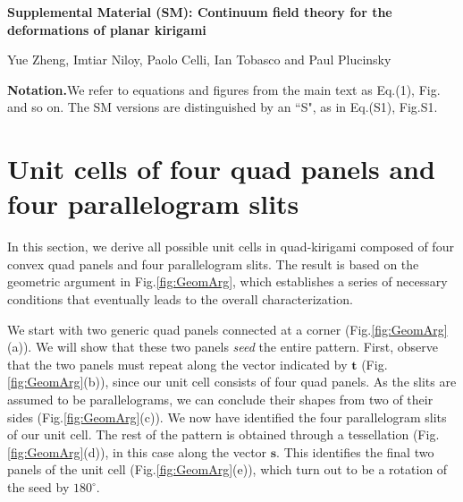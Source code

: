 \documentclass[aps,11pt,tightenlines,notitlepage,superscriptaddress,longbibliography,nofootinbib]{revtex4-1}
\begin{document}
\begin{center}
\Large
{\textbf{Supplemental Material (SM): Continuum field theory for the deformations of planar kirigami}}
\vspace{2mm}
\large

\vspace{2mm}
Yue Zheng, Imtiar Niloy, Paolo Celli,  Ian Tobasco and Paul Plucinsky
\end{center}

\renewcommand{\thesection}{SM.\arabic{section}} 
\renewcommand{\thefigure}{S\arabic{figure}} 
\renewcommand{\thepage}{S\arabic{page}}  
\renewcommand{\theequation}{S\arabic{equation}}  

\tableofcontents

\vspace{.5cm}
\noindent \textbf{Notation.}\;We refer to equations and figures from the main text as Eq.\;(1), Fig. and so on. The SM versions are distinguished by an ``S", as in Eq.\;(S1), Fig.\;S1.  

\section{Unit cells of four quad panels and four parallelogram slits}
\label{s:UC}

In this section, we derive all possible unit cells in quad-kirigami composed of four convex quad panels and four parallelogram slits.  The result is based on the geometric argument in Fig.\;\ref{fig:GeomArg}, which establishes a series of necessary conditions that eventually leads to the overall characterization. 

We start with two generic quad panels connected at a corner (Fig.\;\ref{fig:GeomArg}(a)). We will show that these two panels \textit{seed} the entire pattern.  First, observe that the two panels must repeat along the vector indicated by $\mathbf{t}$ (Fig.\;\ref{fig:GeomArg}(b)), since our unit cell consists of four quad panels. As the slits are assumed to be parallelograms, we can conclude their shapes from two of their sides (Fig.\;\ref{fig:GeomArg}(c)).  We now have identified the four parallelogram slits of our unit cell. The rest of the pattern is obtained through a tessellation (Fig.\;\ref{fig:GeomArg}(d)), in this case along the vector $\mathbf{s}$. This identifies the final two panels of the unit cell (Fig.\;\ref{fig:GeomArg}(e)), which turn out to be a rotation of the seed by $180^{\circ}$.  
\end{document}
